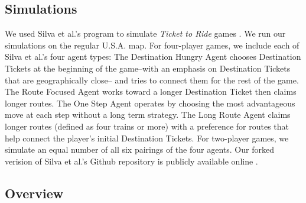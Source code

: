 \subsection{Simulations}
We used Silva et al.'s program to simulate
\textit{Ticket to Ride} games \cite{silva2019}.
We run our simulations on the regular U.S.A. map.
For four-player games, we include each of Silva et al.'s 
four agent types:
The Destination Hungry Agent chooses 
Destination Tickets at the beginning of the
game--with an emphasis on Destination 
Tickets that are geographically close--
and tries to connect them for the rest of the game.
The Route Focused Agent works toward a longer Destination Ticket then
claims longer routes.
The One Step Agent operates by choosing the most advantageous move at each
step without a long term strategy.
The Long Route Agent claims longer routes (defined as four trains or more)
with a preference for routes that help 
connect the player's initial Destination Tickets.
For two-player games, we simulate an equal number 
of all six pairings of the four agents.
Our forked verision of Silva et al.'s
Github repository is publicly available online
\cite{witter2019}.

\subsection{Overview}
